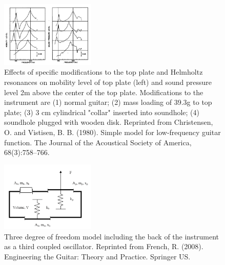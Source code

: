 \documentclass[
reprint,amsmath,amssymb,showpacs,citeautoscript,prb,twocolumn,notitlepage,floatfix
]{revtex4-1}
\begin{document}
\begin{figure}[ht]
    \centering
        \includegraphics[width=0.4\textwidth]{images/christensen1980-two-mass-coupling-experiment.png}
        \caption{Effects of specific modifications to the top plate and Helmholtz resonances on mobility level of top plate (left) and sound pressure level 2m above the center of the top plate. Modifications to the instrument are (1) normal guitar; (2) mass loading of 39.3g to top plate; (3) 3 cm cylindrical "collar" inserted into soundhole; (4) soundhole plugged with wooden disk.  Reprinted from  Christensen, O. and Vistisen, B. B. (1980). Simple model for low-frequency guitar function. The Journal of the Acoustical Society of America, 68(3):758–766.}
        \label{fig:experimental-tuning-two-mass}
\end{figure}

\begin{figure}[ht]
    \centering
        \includegraphics[width=0.4\textwidth]{images/french2008-three-mass-model.png}
        \caption{Three degree of freedom model including the back of the instrument as a third coupled oscillator.  Reprinted from  French, R. (2008). Engineering the Guitar: Theory and Practice. Springer US.}
        \label{fig:three-mass-model}
\end{figure}
\end{document}
